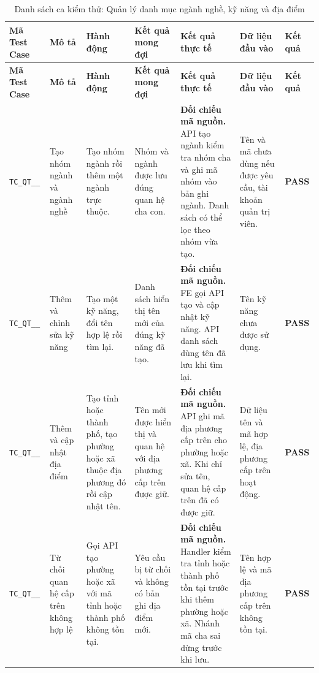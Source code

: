 \begin{landscape}
{
\fontsize{9.5}{11.5}\selectfont
\setlength{\tabcolsep}{3pt}
\renewcommand{\arraystretch}{1.2}
\begin{longtable}{|>{\raggedright\arraybackslash}p{2.1cm}|>{\raggedright\arraybackslash}p{2.8cm}|>{\raggedright\arraybackslash}p{3.8cm}|>{\raggedright\arraybackslash}p{4.0cm}|>{\raggedright\arraybackslash}p{5.0cm}|>{\raggedright\arraybackslash}p{3.2cm}|>{\centering\arraybackslash}p{1.3cm}|}
    \caption{Danh sách ca kiểm thử: Quản lý danh mục ngành nghề, kỹ năng và địa điểm} \label{tab:ts-qt-03} \\
    \hline
    \textbf{Mã Test Case} & \textbf{Mô tả} & \textbf{Hành động} & \textbf{Kết quả mong đợi} & \textbf{Kết quả thực tế} & \textbf{Dữ liệu đầu vào} & \textbf{Kết quả} \\
    \hline
    \endfirsthead
    \hline
    \textbf{Mã Test Case} & \textbf{Mô tả} & \textbf{Hành động} & \textbf{Kết quả mong đợi} & \textbf{Kết quả thực tế} & \textbf{Dữ liệu đầu vào} & \textbf{Kết quả} \\
    \hline
    \endhead
    \hline
    \endfoot
    \hline
    \endlastfoot
    \texttt{TC\_\allowbreak QT\_\allowbreak 03\_\allowbreak 01} & Tạo nhóm ngành và ngành nghề & Tạo nhóm ngành rồi thêm một ngành trực thuộc. & Nhóm và ngành được lưu đúng quan hệ cha con. & \textbf{Đối chiếu mã nguồn.} API tạo ngành kiểm tra nhóm cha và ghi mã nhóm vào bản ghi ngành. Danh sách có thể lọc theo nhóm vừa tạo. & Tên và mã chưa dùng nếu được yêu cầu, tài khoản quản trị viên. & \textbf{PASS} \\
    \hline
    \texttt{TC\_\allowbreak QT\_\allowbreak 03\_\allowbreak 02} & Thêm và chỉnh sửa kỹ năng & Tạo một kỹ năng, đổi tên hợp lệ rồi tìm lại. & Danh sách hiển thị tên mới của đúng kỹ năng đã tạo. & \textbf{Đối chiếu mã nguồn.} FE gọi API tạo và cập nhật kỹ năng. API danh sách dùng tên đã lưu khi tìm lại. & Tên kỹ năng chưa được sử dụng. & \textbf{PASS} \\
    \hline
    \texttt{TC\_\allowbreak QT\_\allowbreak 03\_\allowbreak 03} & Thêm và cập nhật địa điểm & Tạo tỉnh hoặc thành phố, tạo phường hoặc xã thuộc địa phương đó rồi cập nhật tên. & Tên mới được hiển thị và quan hệ với địa phương cấp trên được giữ. & \textbf{Đối chiếu mã nguồn.} API ghi mã địa phương cấp trên cho phường hoặc xã. Khi chỉ sửa tên, quan hệ cấp trên đã có được giữ. & Dữ liệu tên và mã hợp lệ, địa phương cấp trên hoạt động. & \textbf{PASS} \\
    \hline
    \texttt{TC\_\allowbreak QT\_\allowbreak 03\_\allowbreak 04} & Từ chối quan hệ cấp trên không hợp lệ & Gọi API tạo phường hoặc xã với mã tỉnh hoặc thành phố không tồn tại. & Yêu cầu bị từ chối và không có bản ghi địa điểm mới. & \textbf{Đối chiếu mã nguồn.} Handler kiểm tra tỉnh hoặc thành phố tồn tại trước khi thêm phường hoặc xã. Nhánh mã cha sai dừng trước khi lưu. & Tên hợp lệ và mã địa phương cấp trên không tồn tại. & \textbf{PASS} \\

\end{longtable}}
\end{landscape}
